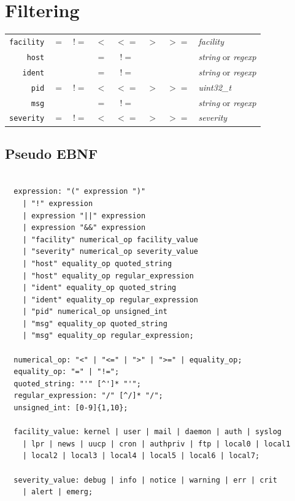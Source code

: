 \chapter{Filtering}

\begin{tabular}{rccccccl}
  \texttt{facility} & $=$ & $!=$ & $<$ & $<=$ & $>$ & $>=$ & \textit{facility} \\
  \texttt{host}     & & & $=$ & $!=$ & & & \textit{string} or \textit{regexp} \\
  \texttt{ident}    & & & $=$ & $!=$ & & & \textit{string} or \textit{regexp} \\
  \texttt{pid}      & $=$ & $!=$ & $<$ & $<=$ & $>$ & $>=$ & \textit{uint32\_t} \\
  \texttt{msg}      & & & $=$ & $!=$ & & & \textit{string} or \textit{regexp} \\
  \texttt{severity} & $=$ & $!=$ & $<$ & $<=$ & $>$ & $>=$ & \textit{severity}
\end{tabular}

\begin{minipage}{\linewidth}
\section{Pseudo EBNF}
\begin{verbatim}

  expression: "(" expression ")"
    | "!" expression
    | expression "||" expression
    | expression "&&" expression
    | "facility" numerical_op facility_value
    | "severity" numerical_op severity_value
    | "host" equality_op quoted_string
    | "host" equality_op regular_expression
    | "ident" equality_op quoted_string
    | "ident" equality_op regular_expression
    | "pid" numerical_op unsigned_int
    | "msg" equality_op quoted_string
    | "msg" equality_op regular_expression;

  numerical_op: "<" | "<=" | ">" | ">=" | equality_op;
  equality_op: "=" | "!=";
  quoted_string: "'" [^']* "'";
  regular_expression: "/" [^/]* "/";
  unsigned_int: [0-9]{1,10};

  facility_value: kernel | user | mail | daemon | auth | syslog
    | lpr | news | uucp | cron | authpriv | ftp | local0 | local1
    | local2 | local3 | local4 | local5 | local6 | local7;

  severity_value: debug | info | notice | warning | err | crit
    | alert | emerg;
\end{verbatim}
\end{minipage}


